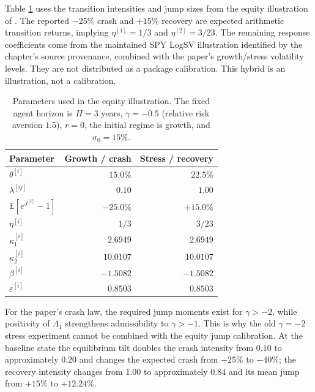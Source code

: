 \documentclass[11pt]{article}
\theoremstyle{remark}
\newcommand{\E}{\mathbb{E}}
\begin{document}
Table \ref{tab:regime_calibration} uses the transition intensities and jump sizes
from the equity illustration of \cite{Sepp2026gba}.  The reported $-25\%$ crash and
$+15\%$ recovery are expected arithmetic transition returns, implying
$\eta^{[1]}=1/3$ and $\eta^{[2]}=3/23$.  The remaining response coefficients come
from the maintained SPY LogSV illustration identified by the chapter's source
provenance, combined with the paper's growth/stress volatility levels.  They are
not distributed as a package calibration.  This hybrid is an illustration, not a calibration.
\begin{table}[htbp]
\centering
\small
\begin{tabular}{lrr}
\toprule
Parameter & Growth / crash & Stress / recovery\\
\midrule
$\theta^{[i]}$ & $15.0\%$ & $22.5\%$\\
$\lambda^{[ij]}$ & $0.10$ & $1.00$\\
$\E[e^{J^{[i]}}-1]$ & $-25.0\%$ & $+15.0\%$\\
$\eta^{[i]}$ & $1/3$ & $3/23$\\
$\kappa_1^{[i]}$ & $2.6949$ & $2.6949$\\
$\kappa_2^{[i]}$ & $10.0107$ & $10.0107$\\
$\beta^{[i]}$ & $-1.5082$ & $-1.5082$\\
$\varepsilon^{[i]}$ & $0.8503$ & $0.8503$\\
\bottomrule
\end{tabular}
\caption{Parameters used in the equity illustration.  The fixed agent horizon is
$H=3$ years, $\gamma=-0.5$ (relative risk aversion $1.5$), $r=0$, the initial
regime is growth, and $\sigma_0=15\%$.}
\label{tab:regime_calibration}
\end{table}
For the paper's crash law, the required jump moments exist for $\gamma>-2$, while
positivity of $\Lambda_1$ strengthens admissibility to $\gamma>-1$.  This is why
the old $\gamma=-2$ stress experiment cannot be combined with the equity jump
calibration.  At the baseline state the equilibrium tilt doubles the crash intensity
from $0.10$ to approximately $0.20$ and changes the expected crash from $-25\%$ to
$-40\%$; the recovery intensity changes from $1.00$ to approximately $0.84$ and its
mean jump from $+15\%$ to $+12.24\%$.
\end{document}
